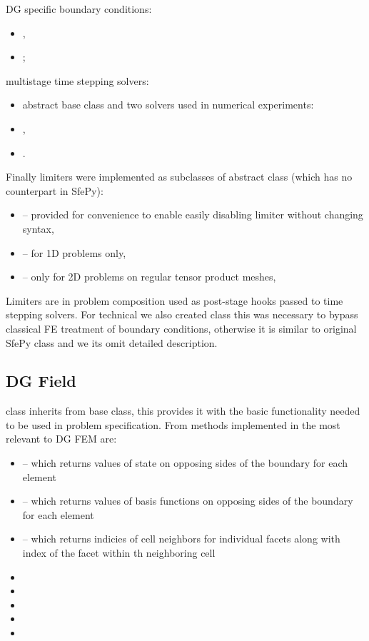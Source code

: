 DG specific boundary conditions:
\begin{itemize}
    \item {},
    \item {};
\end{itemize}
multistage time stepping solvers: 
\begin{itemize}
    \item abstract base class  and two solvers used in numerical  
    experiments: 
    \item {},
    \item {}.
\end{itemize}
 Finally limiters 
were implemented as subclasses of  abstract class (which has 
no counterpart in SfePy):
\begin{itemize}
    \item {} -- provided for convenience to enable 
    easily disabling limiter without changing 
    syntax,
    \item {} -- for 1D problems only,
    \item {} -- only for 2D problems on regular tensor product 
    meshes,
\end{itemize} 
Limiters are in problem composition used as post-stage hooks passed to time 
stepping solvers. For technical we also created  class this was 
necessary to bypass classical FE treatment of boundary conditions, otherwise it is 
similar to original SfePy  class and we its omit detailed description.


\subsection{DG Field}
 class inherits from  base class, this provides it with the basic functionality needed
to be used in problem specification. From methods implemented in  the most relevant to DG FEM are:
\begin{itemize}
    \item {} -- which returns values of state on 
    opposing sides of the boundary for each element
    \item {} -- which returns values of basis functions 
    on opposing sides of the boundary for each element
    \item {} -- which returns indicies of cell neighbors 
    for individual facets along with index of the facet within th neighboring cell 
    \item {}
    \item {}
    \item {}
    \item {}
    \item {}
\end{itemize}

